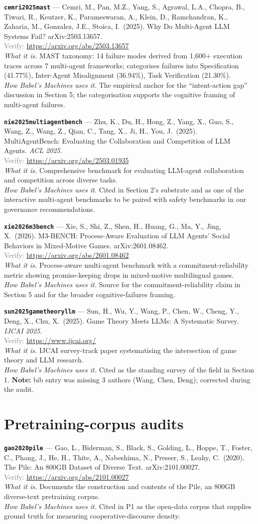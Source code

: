 \documentclass[11pt,a4paper]{article}
\newcommand{\entry}[5]{%
  \par\smallskip
  \noindent\textbf{\texttt{#1}} --- #2\\
  {\footnotesize \textcolor{gray}{Verify:} \url{#3}}\\
  \textit{What it is.} #4\\
  \textit{How Babel's Machines uses it.} #5
  \par\medskip
}
\begin{document}
\entry{cemri2025mast}
{Cemri, M., Pan, M.Z., Yang, S., Agrawal, L.A., Chopra, B., Tiwari, R., Keutzer, K., Parameswaran, A., Klein, D., Ramchandran, K., Zaharia, M., Gonzalez, J.E., Stoica, I.\ (2025). Why Do Multi-Agent LLM Systems Fail? arXiv:2503.13657.}
{https://arxiv.org/abs/2503.13657}
{MAST taxonomy: 14 failure modes derived from 1{,}600+ execution traces across 7 multi-agent frameworks; categorises failures into Specification (41.77\%), Inter-Agent Misalignment (36.94\%), Task Verification (21.30\%).}
{The empirical anchor for the ``intent-action gap'' discussion in Section 5; the categorisation supports the cognitive framing of multi-agent failures.}

\entry{nie2025multiagentbench}
{Zhu, K., Du, H., Hong, Z., Yang, X., Guo, S., Wang, Z., Wang, Z., Qian, C., Tang, X., Ji, H., You, J.\ (2025). MultiAgentBench: Evaluating the Collaboration and Competition of LLM Agents. \emph{ACL 2025}.}
{https://arxiv.org/abs/2503.01935}
{Comprehensive benchmark for evaluating LLM-agent collaboration and competition across diverse tasks.}
{Cited in Section 2's substrate and as one of the interactive multi-agent benchmarks to be paired with safety benchmarks in our governance recommendations.}

\entry{xie2026m3bench}
{Xie, S., Shi, Z., Shen, H., Huang, G., Ma, Y., Jing, X.\ (2026). M3-BENCH: Process-Aware Evaluation of LLM Agents' Social Behaviors in Mixed-Motive Games. arXiv:2601.08462.}
{https://arxiv.org/abs/2601.08462}
{Process-aware multi-agent benchmark with a commitment-reliability metric showing promise-keeping drops in mixed-motive multilingual games.}
{Source for the commitment-reliability claim in Section 5 and for the broader cognitive-failures framing.}

\entry{sun2025gametheoryllm}
{Sun, H., Wu, Y., Wang, P., Chen, W., Cheng, Y., Deng, X., Chu, X.\ (2025). Game Theory Meets LLMs: A Systematic Survey. \emph{IJCAI 2025}.}
{https://www.ijcai.org/}
{IJCAI survey-track paper systematising the intersection of game theory and LLM research.}
{Cited as the standing survey of the field in Section 1. \textbf{Note:} bib entry was missing 3 authors (Wang, Chen, Deng); corrected during the audit.}

\section{Pretraining-corpus audits}

\entry{gao2020pile}
{Gao, L., Biderman, S., Black, S., Golding, L., Hoppe, T., Foster, C., Phang, J., He, H., Thite, A., Nabeshima, N., Presser, S., Leahy, C.\ (2020). The Pile: An 800GB Dataset of Diverse Text. arXiv:2101.00027.}
{https://arxiv.org/abs/2101.00027}
{Documents the construction and contents of the Pile, an 800GB diverse-text pretraining corpus.}
{Cited in P1 as the open-data corpus that supplies ground truth for measuring cooperative-discourse density.}
\end{document}
